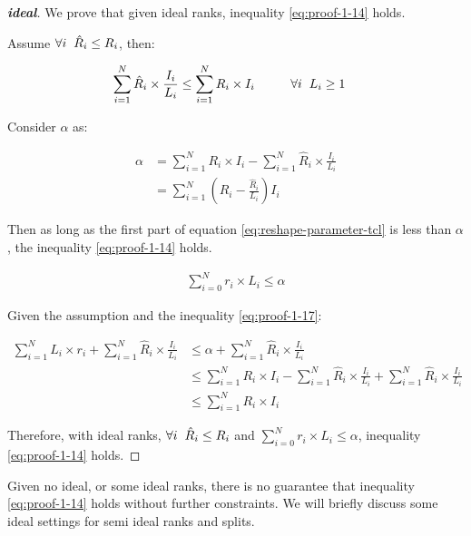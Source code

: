 \documentclass{article}
\begin{document}
\begin{proof}[\textbf{ideal}]
	We prove that given ideal ranks, inequality \ref{eq:proof-1-14} holds. 
	
	Assume $\forall i \hspace{2mm}\hat{R}_i \leq R_i$, then:
	
	\begin{align}
		\label{eq:proof-1-15}
		\sum_{i=1}^{N} \hat{R}_i \times \frac{I_i}{L_i} \leq \sum_{i=1}^{N}R_i\times I_i \hspace{10mm}&  \forall i \hspace{2mm} L_i \geq 1
	\end{align}

	Consider $\alpha$ as:
	
	\begin{align}
		\label{eq:proof-1-16}
		\nonumber
		\alpha &= \sum_{i=1}^{N}R_i\times I_i - \sum_{i=1}^{N} \hat{R}_i \times \frac{I_i}{L_i}
		\\
		&= \sum_{i=1}^{N} (R_i - \frac{\hat{R}_i}{L_i})I_i
	\end{align}

	Then as long as the first part of equation \ref{eq:reshape-parameter-tcl} is less than $\alpha$, the inequality \ref{eq:proof-1-14} holds.
	
	\begin{align}
		\label{eq:proof-1-17}
		\sum_{i=0}^{N} r_i\times L_i \leq \alpha
	\end{align}

	Given the assumption and the inequality \ref{eq:proof-1-17}:
	
	\begin{align}
		\label{eq:proof-1-18}
		\sum_{i=1}^{N}L_i\times r_i + \sum_{i=1}^{N} \hat{R}_i \times \frac{I_i}{L_i} &\leq
		\alpha + \sum_{i=1}^{N} \hat{R}_i \times \frac{I_i}{L_i}
		\nonumber\\
		&\leq \sum_{i=1}^{N}R_i\times I_i - \sum_{i=1}^{N} \hat{R}_i \times \frac{I_i}{L_i} + \sum_{i=1}^{N} \hat{R}_i \times \frac{I_i}{L_i}
		\nonumber\\
		&\leq \sum_{i=1}^{N}R_i\times I_i
	\end{align}

Therefore, with ideal ranks, $\forall i \hspace{2mm}\hat{R}_i \leq R_i$ and $\sum_{i=0}^{N} r_i\times L_i \leq \alpha$, inequality \ref{eq:proof-1-14} holds.
\end{proof}

Given no ideal, or some ideal ranks, there is no guarantee that inequality \ref{eq:proof-1-14} holds without further constraints. We will briefly discuss some ideal settings for semi ideal ranks and splits.  
\end{document}
